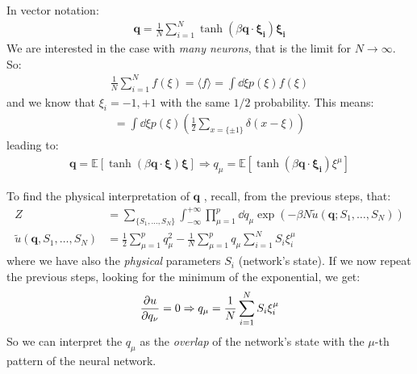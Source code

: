\documentclass[../template.tex]{subfiles}
\begin{document}
In vector notation:
\begin{align*}
    \bm{q} = \frac{1}{N} \sum_{i=1}^N \tanh(\beta \bm{q}\cdot \bm{\xi_i}) \bm{\xi_i}
\end{align*}
We are interested in the case with \textit{many neurons}, that is the limit for $N \to \infty$. So:
\begin{align*}
    \frac{1}{N} \sum_{i=1}^N f(\xi) = \langle f \rangle  = \int \dd{\xi} p(\xi) f(\xi)
\end{align*} 
and we know that $\xi_i = {-1,+1}$ with the same $1/2$ probability. This means:
\begin{align*}
    = \int \dd{\xi} p(\xi)\left(\frac{1}{2} \sum_{x=\{\pm1\}} \delta(x- \xi)\right)
\end{align*}  
leading to:
\begin{align*}
    \bm{q} = \mathbb{E}[\tanh(\beta \bm{q}\cdot \bm{\xi}) \bm{\xi}] \Rightarrow q_\mu = \mathbb{E}[\tanh (\beta \bm{q}\cdot \bm{\xi_i})\xi^\mu]
\end{align*}

To find the physical interpretation of $\bm{q}$ , recall, from the previous steps, that:
\begin{align*}
    Z &= \sum_{\{S_1, \dots, S_N\}} \int_{-\infty}^{+\infty} \prod_{\mu=1}^p \dd{q_\mu} \exp\left(-\beta N \tilde{u}(\bm{q}; S_1, \dots, S_N)\right)\\
    \tilde{u}(\bm{q}, S_1, \dots, S_N) &= \frac{1}{2} \sum_{\mu = 1}^p q_{\mu}^2 - \frac{1}{N} \sum_{\mu=1}^p q_\mu \sum_{i=1}^N S_i \xi_i^\mu  
\end{align*} 
where we have also the \textit{physical} parameters $S_i$ (network's state). If we now repeat the previous steps, looking for the minimum of the exponential, we get:
\begin{align*}
    \pdv{u}{q_\nu} = 0 \Rightarrow q_\mu = \frac{1}{N} \sum_{i=1}^N S_i \xi_i^\mu 
\end{align*}
So we can interpret the $q_\mu$ as the \textit{overlap} of the network's state with the $\mu$-th pattern of the neural network.
\end{document}
